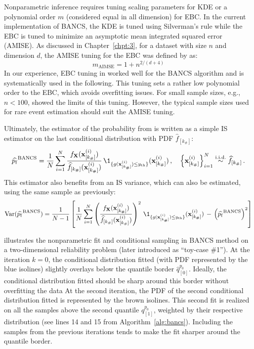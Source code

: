 Nonparametric inference requires tuning scaling parameters for KDE or a polynomial order $m$ (considered equal in all dimension) for EBC. 
In the current implementation of BANCS, the KDE is tuned using Silverman's rule \citep{silverman_1981} while the EBC is tuned to minimize an asymptotic mean integrated squared error (AMISE). 
As discussed in Chapter~\ref{chpt:3}, for a dataset with size $n$ and dimension $d$, the AMISE tuning for the EBC was defined by \citet{sancetta_satchell_2004} as:
\begin{equation}\label{eq:amise_tuning}
    m_{\mathrm{AIMSE}} = 1 + n^{2/(d+4)}
\end{equation}
In our experience, EBC tuning in  worked well for the BANCS algorithm and is systematically used in the following. 
This tuning sets a rather low polynomial order to the EBC, which avoids overfitting issues. 
For small sample sizes, e.g., $n<100$, \citet{segers_2017} showed the limits of this tuning. 
However, the typical sample sizes used for rare event estimation should suit the AMISE tuning. 

Ultimately, the estimator of the probability from  is written as a simple IS estimator on the last conditional distribution with PDF $\widehat{f}_{[k_\#]}$:
\begin{equation}
    \widehat{\pf}^{\mathrm{BANCS}} = \frac1N \sum_{i=1}^N \frac{f_\bX(\bx_{[k_\#]}^{(i)})}{\widehat{f}_{[k_\#]}(\bx_{[k_\#]}^{(i)})} \, \1_{\{g(\bx_{[k_\#]}^{(i)}) \leq \yth \}}(\bx_{[k_\#]}^{(i)})\, , \quad \left\{\bx_{[k_\#]}^{(i)}\right\}_{i=1}^N  \overset{\text{i.i.d.}}{\sim} \widehat{f}_{[k_\#]} \, .
\end{equation}
This estimator also benefits from an IS variance, which can also be estimated, using the same sample as previously:
\begin{equation}
    \var(\widehat{\pf}^{\mathrm{BANCS}}) = \frac{1}{N-1} \left[\frac1N \sum_{i=1}^N \left(\frac{f_\bX(\bx_{[k_\#]}^{(i)})}{\widehat{f}_{[k_\#]}(\bx_{[k_\#]}^{(i)})}\right)^2 \, \1_{\{g(\bx_{[k_\#]}^{(i)}) \leq \yth \}}(\bx_{[k_\#]}^{(i)}) \, - \, \left(\widehat{\pf}^{\mathrm{BANCS}}\right)^2\right]
\end{equation}

 illustrates the nonparametric fit and conditional sampling in BANCS method on a two-dimensional reliability problem (later introduced as ``toy-case \#1''). 
At the iteration $k=0$, the conditional distribution fitted (with PDF represented by the blue isolines) slightly overlays below the quantile border $\widehat{q}_{[0]}^{p_0}$. 
Ideally, the conditional distribution fitted should be sharp around this border without overfitting the data
At the second iteration, the PDF of the second conditional distribution fitted is represented by the brown isolines. 
This second fit is realized on all the samples above the second quantile $\widehat{q}_{[1]}^{p_0}$, weighted by their respective distribution (see lines 14 and 15 from Algorithm~\ref{alg:bancs}). 
Including the samples from the previous iterations tends to make the fit sharper around the quantile border. 


